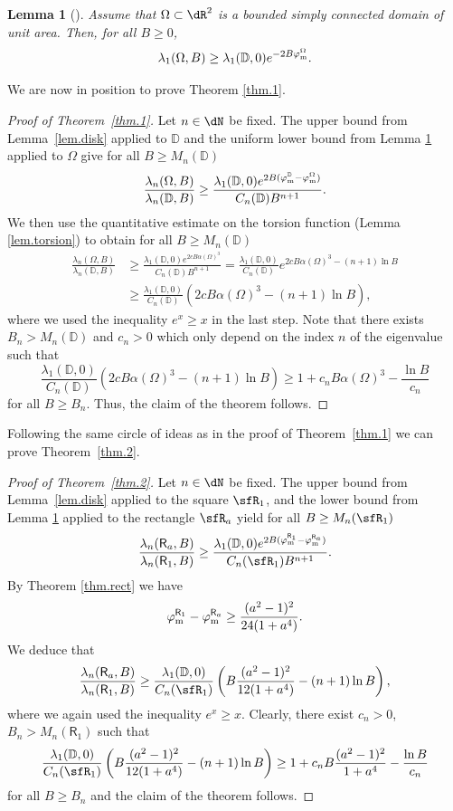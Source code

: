 \documentclass[11pt,a4paper]{amsart}
\newcommand\Omg{\Omega}
\def\lm{\lambda}
\numberwithin{figure}{section}
\numberwithin{equation}{section}
\theoremstyle{plain}%
\theoremstyle{remark}
\theoremstyle{plain}
\newtheorem{lemma}[theorem]{Lemma}
\newcommand{\D}{\mathbb D}
\begin{document}
\begin{lemma}[{\cite[Theorem 3.1]{HelfferSundqvist}}]\label{lem.lowerbound}
Assume that $\Omega\subset\dR^2$ is a bounded simply connected domain of unit area. Then, for all $B \geq 0$,
\[ \lambda_1(\Omega,B) \geq \lambda_1(\D,0) e^{-2B \varphi_{\rm m}^\Omega}. \]
\end{lemma}

We are now in position to prove Theorem \ref{thm.1}.
\begin{proof}[Proof of Theorem~\ref{thm.1}]
Let $n\in\dN$ be fixed.	
The upper bound from Lemma~\ref{lem.disk} applied to $\D$ and the uniform lower bound from Lemma \ref{lem.lowerbound} applied to $\Omg$ give for all $B \ge M_n(\D)$
\begin{equation}
\frac{\lambda_n(\Omega,B)}{\lambda_n(\D,B)} \geq \frac{\lambda_1(\D,0) e^{2B (\varphi_{\rm m} ^\D - \varphi_{\rm m}^\Omega)}}{C_n(\D) B^{n+1}}.
\end{equation}
We then use the quantitative estimate on the torsion function (Lemma \ref{lem.torsion}) to obtain for all $B  \ge M_n(\D)$
\begin{align*}
\frac{\lambda_n(\Omega,B)}{\lambda_n(\D,B)} &\geq \frac{\lambda_1(\D,0) e^{2c B \alpha(\Omega)^3}}{C_n(\D) B^{n+1}} = \frac{\lambda_1(\D,0)}{C_n(\D)} e^{2cB \alpha(\Omega)^3 - (n+1) \ln B} \\
&\geq \frac{\lm_1(\D,0)}{C_n(\D)}\left(2 c  B \alpha(\Omega)^3 - (n+1) \ln B\right),
\end{align*}
where we used the inequality $e^x \ge x$ in the last step.
Note that there exists $B_n > M_n(\D)$ and $c_n > 0$
which only depend on the index $n$ of the eigenvalue
such that
\[
\frac{\lm_1(\D,0)}{C_n(\D)}\left(2 c  B \alpha(\Omega)^3 - (n+1) \ln B\right) \ge 1+ c_n B\alpha(\Omega)^3 -\frac{\ln B}{c_n}
\]
for all $B \ge B_n$. Thus, the claim of the theorem follows.
\end{proof}

Following the same circle of ideas as in the proof of Theorem~\ref{thm.1} we can prove Theorem~\ref{thm.2}.
\begin{proof}[Proof of Theorem~\ref{thm.2}]
Let $n\in\dN$ be fixed.
The upper bound from Lemma~\ref{lem.disk} applied to the square $\sfR_1$, and the lower bound from Lemma \ref{lem.lowerbound}
applied to the rectangle $\sfR_a$ yield for all $B \ge M_n(\sfR_1)$
\[ \frac{\lambda_n(\mathsf R_a ,B)}{\lambda_n(\mathsf R_1,B)} \geq \frac{\lambda_1(\D,0) e^{2B (\varphi_{\rm m}^{\mathsf R_1} - \varphi_{\rm m}^{\mathsf R_a})} }{C_n(\sfR_1) B^{n+1}}. \]
By Theorem \ref{thm.rect} we have
\[ \varphi_{\rm m}^{\mathsf R_1} - \varphi_{\rm m}^{\mathsf R_a} \geq \frac{(a^2-1)^2}{24(1+a^4)}. \]
We deduce that
\[ \frac{\lambda_n(\mathsf R_a ,B)}{\lambda_n(\mathsf R_1,B)} \geq   \frac{\lambda_1(\D,0)}{C_n(\sfR_1) } \left(B\frac{(a^2-1)^2}{12(1+a^4)} -(n+1) \ln B\right), \]
where we again used the inequality $e^x \ge x$.
Clearly, there exist $c_n>0$, $B_n > M_n(\mathsf R_1)$ such that
\[
  \frac{\lambda_1(\D,0)}{C_n(\sfR_1) } \left(B\frac{(a^2-1)^2}{12(1+a^4)} -(n+1) \ln B\right)
  \ge 1 + c_n B \frac{(a^2-1)^2}{1+a^4} - \frac{\ln B}{c_n}
\]
for all $B \ge B_n$ and the claim of the theorem follows.
\end{proof}
\end{document}
